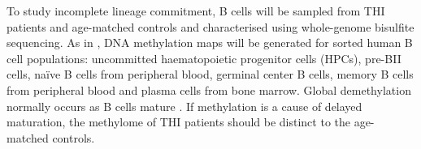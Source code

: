 \documentclass[12pt]{article}
\newcommand{\naive}{na\"{i}ve }
\begin{document}
		To study incomplete lineage commitment, B cells will be sampled from THI patients and age-matched controls and characterised using whole-genome bisulfite sequencing.
		As in \citet{Kulis15}, DNA methylation maps will be generated for sorted human B cell populations: uncommitted haematopoietic progenitor cells (HPCs), pre-BII cells, \naive B cells from peripheral blood, germinal center B cells, memory B cells from peripheral blood and plasma cells from bone marrow.
		Global demethylation normally occurs as B cells mature \citep{Oakes16}. 
		If methylation is a cause of delayed maturation, the methylome of THI patients should be distinct to the age-matched controls.
		
		
	
	
	
\end{document}
